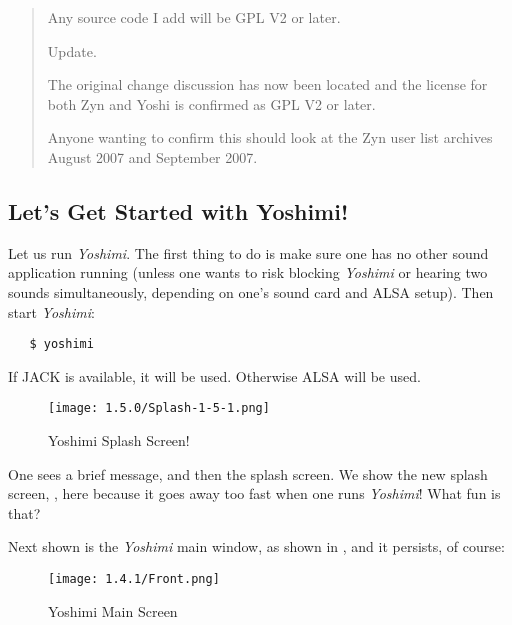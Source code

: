 \documentclass[
 11pt,
 twoside,
 a4paper,
 final                                 %
]{article}
\begin{document}
\begin{quotation}
      Any source code I add will be GPL V2 or later.

      Update.

      The original change discussion has now been located and the license for
      both Zyn and Yoshi is confirmed as GPL V2 or later.

      Anyone wanting to confirm this should look at the Zyn user list archives
      August 2007 and September 2007.
   \end{quotation}

\subsection{Let's Get Started with Yoshimi!}
\label{subsec:introduction_lets_get_started}

   Let us run \textsl{Yoshimi}.
   The first
   thing to do is make sure one has no other sound application running
   (unless one wants to risk blocking \textsl{Yoshimi} or hearing two sounds
   simultaneously, depending on one's sound card and ALSA setup).
   Then start \textsl{Yoshimi}:

\begin{verbatim}
   $ yoshimi
\end{verbatim}

   If JACK is available, it will be used.  Otherwise ALSA will be used.

\begin{figure}[H]
   \centering 
   \texttt{[image: 1.5.0/Splash-1-5-1.png]}
   \caption{Yoshimi Splash Screen!}
   \label{fig:yoshimi_splash_screen}
\end{figure}

   One sees a brief message, and then the splash screen.
   We show the new splash screen, ,
   here because it goes away too fast when one runs \textsl{Yoshimi}!
   What fun is that?

   Next shown is the \textsl{Yoshimi} main window,
   as shown in ,
   and it persists, of course:

\begin{figure}[H]
   \centering 
   \texttt{[image: 1.4.1/Front.png]}
   \caption{Yoshimi Main Screen}
   \label{fig:yoshimi_main_screen}
\end{figure}
\end{document}
